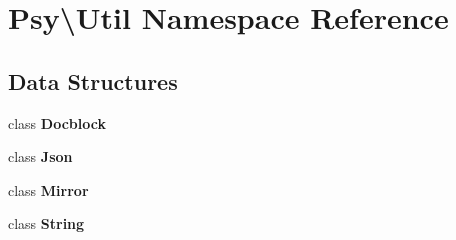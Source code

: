 \section{Psy\textbackslash{}Util Namespace Reference}
\label{namespace_psy_1_1_util}
\subsection*{Data Structures}
\begin{DoxyCompactItemize}
\item 
class {\bf Docblock}
\item 
class {\bf Json}
\item 
class {\bf Mirror}
\item 
class {\bf String}
\end{DoxyCompactItemize}
